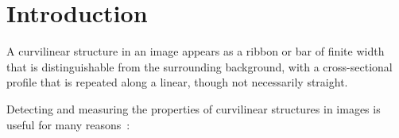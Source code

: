 \documentclass{IEEEtran}
\title{\ttl}
\author{Authors}
\begin{document}
\tableofcontents\clearpage

\maketitle

\begin{abstract}
*Rewrite this when paper content is finalised*
Estimating orientation of image structure underpins applications including digital mammography, retinography and fingerprint analysis. We consider different choices of filter bank including those based on first and second derivatives, efficient Haar-like features and the Dual Tree Complex Wavelet Transform. We then investigate how standard regressors (linear regression, Boosting and Random Forests) may be adapted to use the responses to these filter banks in order to predict orientation of image structure. For a quantitative evaluation, we use synthetic images based on mammograms and the publicly available DRIVE database of retinal images, and show that Random Forests and the wavelet transform offer superior accuracy though at a cost in efficiency.
\end{abstract}




\section{Introduction}
A curvilinear structure in an image appears as a ribbon or bar of finite width that is distinguishable from the surrounding background, with a cross-sectional profile that is repeated along a linear, though not necessarily straight.


Detecting and measuring the properties of curvilinear structures in images is useful for many reasons~\cite{Ayres_Rangayyan_JEI07}:
\end{document}
